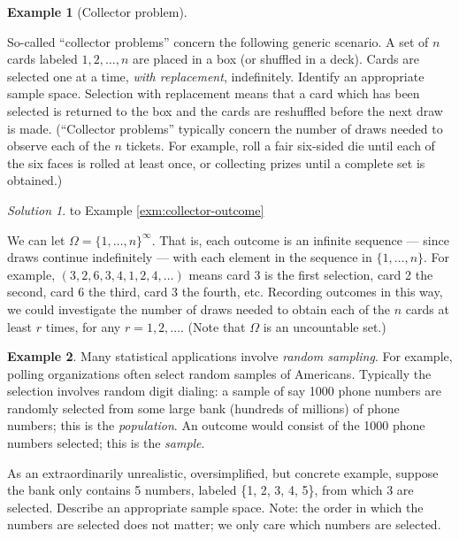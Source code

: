 \documentclass[
]{book}
\theoremstyle{definition}
\theoremstyle{definition}
\newtheorem{example}{Example}[chapter]
\theoremstyle{definition}
\theoremstyle{remark}
\newtheorem*{solution}{Solution}
\begin{document}
\begin{example}[Collector problem]
\protect\hypertarget{exm:collector-outcome}{}{\label{exm:collector-outcome} {} }

So-called ``collector problems'' concern the following generic scenario. A set of \(n\) cards labeled \(1, 2, \ldots, n\) are placed in a box (or shuffled in a deck). Cards are selected one at a time, \emph{with replacement}, indefinitely. Identify an appropriate sample space. Selection with replacement means that a card which has been selected is returned to the box and the cards are reshuffled before the next draw is made. (``Collector problems'' typically concern the number of draws needed to observe each of the \(n\) tickets. For example, roll a fair six-sided die until each of the six faces is rolled at least once, or collecting prizes until a complete set is obtained.)
\end{example}

\begin{solution}
{}to Example \ref{exm:collector-outcome}
\end{solution}

We can let \(\Omega=\{1, \ldots, n\}^\infty\). That is, each outcome is an infinite sequence --- since draws continue indefinitely --- with each element in the sequence in \(\{1, \ldots, n\}\). For example, \((3, 2, 6, 3, 4, 1, 2, 4, \ldots)\) means card 3 is the first selection, card 2 the second, card 6 the third, card 3 the fourth, etc. Recording outcomes in this way, we could investigate the number of draws needed to obtain each of the \(n\) cards at least \(r\) times, for any \(r=1,2, \ldots\). (Note that \(\Omega\) is an uncountable set.)

\begin{example}
\protect\hypertarget{exm:sampling-outcome}{}{\label{exm:sampling-outcome} }Many statistical applications involve \emph{random sampling}. For example, polling organizations often select random samples of Americans. Typically the selection involves random digit dialing: a sample of say 1000 phone numbers are randomly selected from some large bank (hundreds of millions) of phone numbers; this is the \emph{population}. An outcome would consist of the 1000 phone numbers selected; this is the \emph{sample}.

As an extraordinarily unrealistic, oversimplified, but concrete example, suppose the bank only contains 5 numbers, labeled \{1, 2, 3, 4, 5\}, from which 3 are selected. Describe an appropriate sample space. Note: the order in which the numbers are selected does not matter; we only care which numbers are selected.
\end{example}
\end{document}

